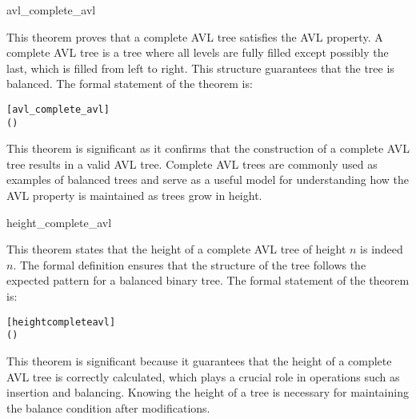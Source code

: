 	
	\begin{thm}{avl\_complete\_avl}

    This theorem proves that a complete AVL tree satisfies the AVL property. A complete AVL tree is a tree where all levels are fully filled except possibly the last, which is filled from left to right. This structure guarantees that the tree is balanced. The formal statement of the theorem is:
    
    \begin{alltt}
    	[avl_complete_avl]
    	\HOLTokenTurnstile{}  ( ) \HOLSymConst{\HOLTokenEquiv{}} 
    \end{alltt}
    
    
    
    \end{thm}

	This theorem is significant as it confirms that the construction of a complete AVL tree results in a valid AVL tree. Complete AVL trees are commonly used as examples of balanced trees and serve as a useful model for understanding how the AVL property is maintained as trees grow in height.
	
	\begin{thm}{height\_complete\_avl}

    This theorem states that the height of a complete AVL tree of height \( n \) is indeed \( n \). The formal definition ensures that the structure of the tree follows the expected pattern for a balanced binary tree. The formal statement of the theorem is:
    
    \begin{alltt}
    	[height complete avl]
    	\HOLTokenTurnstile{}  ( ) \HOLSymConst{=} 
    \end{alltt}
    
    
    \end{thm}

	This theorem is significant because it guarantees that the height of a complete AVL tree is correctly calculated, which plays a crucial role in operations such as insertion and balancing. Knowing the height of a tree is necessary for maintaining the balance condition after modifications.
	
